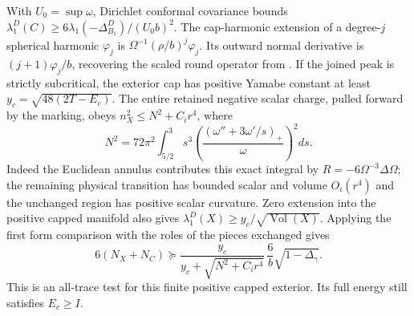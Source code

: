 \documentclass[11pt,letterpaper]{article}
\numberwithin{equation}{section}
\begin{document}
With \(U_0=\sup\omega\), Dirichlet conformal covariance bounds
\(\lambda_1^D(C)\ge 6\lambda_1(-\Delta^D_{B_1})/(U_0 b)^2\).
The cap-harmonic extension of a degree-\(j\) spherical harmonic
\(\varphi_j\) is \(\Omega^{-1}(\rho/b)^j\varphi_j\). Its outward
normal derivative is \((j+1)\varphi_j/b\), recovering the scaled
round operator from \cite[Round boundary form]{Baker2026FixedDescent}.
If the joined peak is strictly subcritical, the exterior cap has
positive Yamabe constant at least \(y_c=\sqrt{48(2T-E_c)}\).
The entire retained negative scalar charge, pulled forward by the
marking, obeys \(n_X^2\le N^2+C_i r^4\), where
\[
 N^2=72\pi^2\int_{5/2}^3 s^3
    \left(\frac{(\omega''+3\omega'/s)_+}{\omega}\right)^2ds .
\]
Indeed the Euclidean annulus contributes this exact integral
by \(R=-6\Omega^{-3}\Delta\Omega\); the remaining physical
transition has bounded scalar and volume \(O_i(r^4)\) and the
unchanged region has positive scalar curvature. Zero extension into the positive capped manifold also gives
\(\lambda_1^D(X)\ge y_c/\sqrt{\operatorname{Vol}(X)}\).
Applying the first form comparison with the roles of the pieces exchanged gives
\[
 6(N_X+N_C)\succeq
 \frac{y_c}{y_c+\sqrt{N^2+C_i r^4}}\,
 \frac{6}{b}\sqrt{1-\Delta_\gamma}.
\]
This is an all-trace test for this finite positive capped
exterior. Its full energy still satisfies \(E_c\ge I\).
\end{document}
